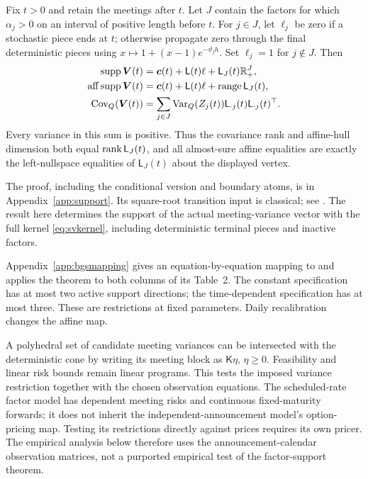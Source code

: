 \begin{theorem}\label{thm:svsupport}
Fix $t>0$ and retain the meetings after $t$. Let $J$ contain the factors for which $\alpha_j>0$ on an interval of positive length before $t$. For $j\in J$, let $\ell_j$ be zero if a stochastic piece ends at $t$; otherwise propagate zero through the final deterministic pieces using $x\mapsto1+(x-1)e^{-\vartheta_j h}$. Set $\ell_j=1$ for $j\notin J$. Then
\begin{align}
\operatorname{supp}\boldsymbol V(t)&=\boldsymbol c(t)+\mathsf L(t)\ell
                                      +\mathsf L_J(t)\mathbb R_+^J,\label{eq:support}\\
\operatorname{aff}\operatorname{supp}\boldsymbol V(t)&=\boldsymbol c(t)+\mathsf L(t)\ell
                                      +\operatorname{range}\mathsf L_J(t),\nonumber\\
\operatorname{Cov}_Q(\boldsymbol V(t))&=\sum_{j\in J}\operatorname{Var}_Q(Z_j(t))\mathsf L_{\cdot j}(t)
                                      \mathsf L_{\cdot j}(t)^\top.\nonumber
\end{align}
Every variance in this sum is positive. Thus the covariance rank and affine-hull dimension both equal $\operatorname{rank}\mathsf L_J(t)$, and all almost-sure affine equalities are exactly the left-nullspace equalities of $\mathsf L_J(t)$ about the displayed vertex.
\end{theorem}
The proof, including the conditional version and boundary atoms, is in Appendix~\ref{app:support}. Its square-root transition input is classical; see \citet{malham2008square}. The result here determines the support of the actual meeting-variance vector with the full kernel \eqref{eq:svkernel}, including deterministic terminal pieces and inactive factors.

Appendix~\ref{app:bgsmapping} gives an equation-by-equation mapping to \citet{brace2024sofr} and applies the theorem to both columns of its Table~2. The constant specification has at most two active support directions; the time-dependent specification has at most three. These are restrictions at fixed parameters. Daily recalibration changes the affine map.

A polyhedral set of candidate meeting variances can be intersected with the deterministic cone by writing its meeting block as $\mathsf K\eta$, $\eta\geq0$. Feasibility and linear risk bounds remain linear programs. This tests the imposed variance restriction together with the chosen observation equations. The scheduled-rate factor model has dependent meeting risks and continuous fixed-maturity forwards; it does not inherit the independent-announcement model's option-pricing map. Testing its restrictions directly against prices requires its own pricer. The empirical analysis below therefore uses the announcement-calendar observation matrices, not a purported empirical test of the factor-support theorem.
